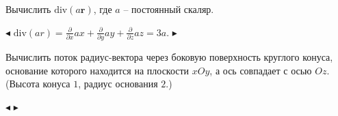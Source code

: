 \documentclass[a5paper,10pt]{article}
\begin{document}
\medskip
{} Вычислить $\mbox{div}(a\boldsymbol{r})$, где $a$ -- постоянный скаляр.

\smallskip
\noindent $\blacktriangleleft$ $\mbox{div}(ar)=\frac{\partial}{\partial x}ax+
\frac{\partial}{\partial y}ay+\frac{\partial}{\partial z}az=3a.$
$\blacktriangleright$

\medskip
{} Вычислить поток радиус-вектора через боковую
поверхность круглого конуса, основание которого находится
на плоскости $xOy$, а ось совпадает с осью $Oz$. (Высота
конуса $1$, радиус основания $2$.)\bigskip

\smallskip
\noindent $\blacktriangleleft$
$\blacktriangleright$

\bigskip
{}
\end{document}
